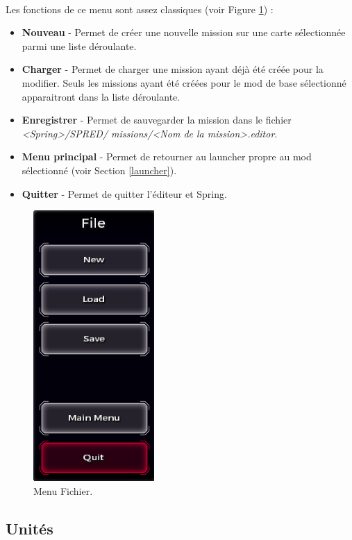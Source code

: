 \documentclass[a4paper]{article}
\begin{document}
\paragraph{ }
Les fonctions de ce menu sont assez classiques (voir Figure \ref{fig:editor-file}) :
\begin{itemize}
\item \textbf{Nouveau} - Permet de créer une nouvelle mission sur une carte sélectionnée parmi une liste déroulante.
\item \textbf{Charger} - Permet de charger une mission ayant déjà été créée pour la modifier. Seuls les missions ayant été créées pour le mod de base sélectionné apparaitront dans la liste déroulante.
\item \textbf{Enregistrer} - Permet de sauvegarder la mission dans le fichier \textit{<Spring>/SPRED/ missions/<Nom de la mission>.editor}.
\item \textbf{Menu principal} - Permet de retourner au launcher propre au mod sélectionné (voir Section \ref{launcher}).
\item \textbf{Quitter} - Permet de quitter l'éditeur et Spring.
\end{itemize}
\begin{figure}[H]
\centering
\includegraphics[scale=0.5]{editor-file.png}
\caption{Menu Fichier.}
\label{fig:editor-file}
\end{figure}
\subsection{Unités}
\end{document}
